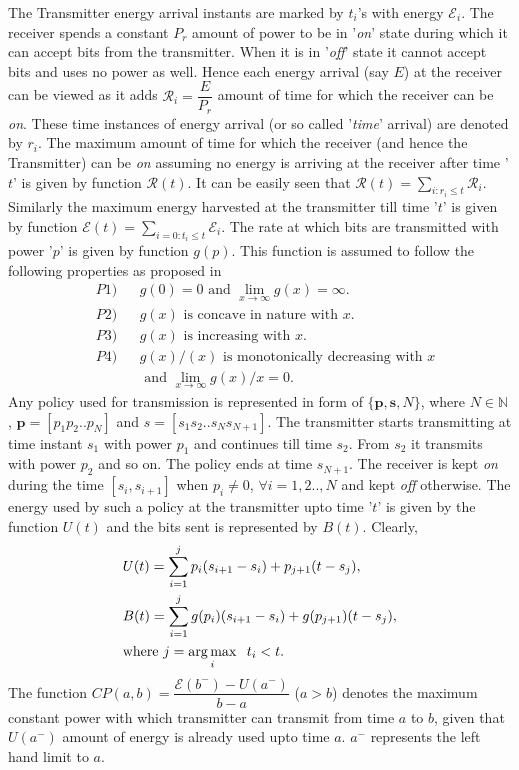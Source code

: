 The Transmitter energy arrival instants are marked by $t_i$'s with energy $\mathcal{E}_i$. %
 The receiver spends a constant $P_{r}$ amount of power to be in '\textit{on}' state during which it can accept bits from the transmitter. When it is in '\textit{off}' state it cannot accept bits and uses no power as well. Hence each energy arrival (say $E$) at the receiver can be viewed as it adds $\mathcal{R}_i=\dfrac{E}{P_{r}}$ amount of time for which the receiver can be \textit{on}. These time instances of energy arrival (or so called '\textit{time}' arrival) are denoted by $r_i$. The maximum amount of time for which the receiver (and hence the Transmitter) can be \textit{on} assuming no energy is arriving at the receiver after time '$t$' is given by function $\mathcal{R}(t)$. It can be easily seen that $\mathcal{R}(t)=\underset{i:r_i\le t}{\sum}\mathcal{R}_i$. Similarly the maximum energy harvested at the transmitter till time '$t$' is given by function $\mathcal{E}(t)=\underset{i=0:t_i\le t}{\sum}\mathcal{E}_i$. The rate at which bits are transmitted with power '$p$' is given by function $g(p)$. This function is assumed to follow the following properties as proposed in \cite{Yang} 
\begin{align}
&P1) &&g(0)=0\text{ and }\lim_{x\rightarrow \infty} g(x)= \infty.\label{property_0_infty}
\\
&P2) &&g(x)\text{ is concave in nature with } x.\label{property_concave}
\\
&P3) &&g(x)\text{ is increasing with } x.\label{property_increasing}
\\ 
&P4) &&g(x)/(x) \text{ is monotonically decreasing with } x\nonumber
\\
&    &&\text{ and } \lim_{x\rightarrow \infty} g(x)/x= 0.\label{property_decreasing}
\end{align}
Any policy used for transmission is represented in form of $\{\textbf{p},\textbf{s},N\}$, where $N\in \mathbb{N}$, $\textbf{p}=[p_1 p_2 .. p_N]$ and $s=[s_1 s_2 .. s_N s_{N+1}]$. The transmitter starts transmitting at time instant $s_1$ with power $p_1$ and continues till time $s_2$. From $s_2$ it transmits with power $p_2$ and so on. The policy ends at time $s_{N+1}$. The receiver is kept \textit{on} during the time $[s_i,s_{i+1}]$ when $p_i\ne 0$, $\forall i=1,2..,N$ and kept \textit{off} otherwise. The energy used by such a policy at the transmitter upto time '$t$' is given by the function $U(t)$ and the bits sent is represented by $B(t)$. Clearly,
\begin{align}
&U(t)=\sum_{i=1}^{j} p_i(s_{i+1}-s_i)+p_{j+1}(t-s_j) ,
\\
&B(t)=\sum_{i=1}^{j} g(p_i)(s_{i+1}-s_i)+g(p_{j+1})(t-s_j),
\\
&\text{where }j=\operatorname*{arg\,max}_{i} \hspace{2mm}t_i<t.\nonumber
\end{align}
The function $CP(a,b)=\dfrac{\mathcal{E}(b^- )-U(a^- )}{b-a}$ ($a>b$) denotes the maximum constant power with which transmitter can transmit from time $a$ to $b$, given that $U(a^- )$ amount of energy is already used upto time $a$. $a^-$ represents the left hand limit to $a$.

